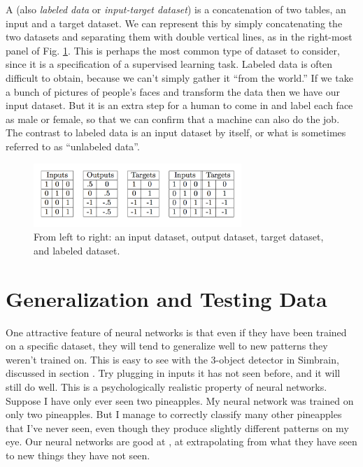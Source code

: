 A  (also \emph{labeled data} or \emph{input-target dataset}) is a concatenation of two tables, an input and a target dataset. We can represent this by simply concatenating the two datasets and separating them with double vertical lines, as in the right-most panel of Fig. \ref{datasetTypes}. This is perhaps the most common type of dataset to consider, since it is a specification of a supervised learning task. Labeled data is often difficult to obtain, because we can't simply gather it ``from the world.''  If we take a bunch of pictures of people's faces and transform the data then we have our input dataset. But it is an extra step for a human to come in and label each face as male or female, so that we can confirm that a machine can also do the job. The contrast to labeled  data  is an input dataset by itself, or what is sometimes referred to as ``unlabeled data''. 

\begin{figure}[h]
\centering
\includegraphics[width=0.7\textwidth]{./images/datasetTypes.png}
\caption[Jeff Yoshimi.]{From left to right: an input dataset, output dataset, target dataset, and labeled dataset.}
\label{datasetTypes}
\end{figure}

\section{Generalization and Testing Data }

One attractive feature of neural networks is that even if they have been trained on a specific dataset, they will tend to generalize well to new patterns they weren't trained on. This is easy to see with the 3-object detector in Simbrain, discussed in section . Try plugging in inputs it has not seen before, and it will still do well. This is a psychologically realistic property of neural networks. Suppose I have only ever seen two pineapples. My neural network was trained on only two pineapples. But I manage to correctly classify many other pineapples that I've never seen, even though they produce slightly different patterns on my eye. Our neural networks are good at , at extrapolating from what they have seen to new things they have not seen.

